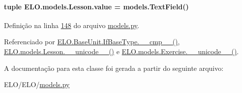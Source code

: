 \hypertarget{classELO_1_1models_1_1Lesson_a27927b9763fb13a9e41b3f826439c600}{
\paragraph[{value}]{\setlength{\rightskip}{0pt plus 5cm}tuple E\-L\-O.\-models.\-Lesson.\-value = models.\-Text\-Field()\hspace{0.3cm}{\ttfamily [static]}}}\label{classELO_1_1models_1_1Lesson_a27927b9763fb13a9e41b3f826439c600}


Definição na linha \hyperlink{ELO_2models_8py_source_l00148}{148} do arquivo \hyperlink{ELO_2models_8py_source}{models.\-py}.



Referenciado por \hyperlink{classELO_1_1BaseUnit_1_1IfBaseType_a69c338f6f1574bd3524e9d59ebc17a7c}{E\-L\-O.\-Base\-Unit.\-If\-Base\-Type.\-\_\-\-\_\-cmp\-\_\-\-\_\-()}, \hyperlink{classELO_1_1models_1_1Lesson_a3d9f0295dbe1ed5c74668d6c0876f97c}{E\-L\-O.\-models.\-Lesson.\-\_\-\-\_\-unicode\-\_\-\-\_\-()} e \hyperlink{classELO_1_1models_1_1Exercise_af3e991e5610cec815a2c3260ec6aae0b}{E\-L\-O.\-models.\-Exercise.\-\_\-\-\_\-unicode\-\_\-\-\_\-()}.



A documentação para esta classe foi gerada a partir do seguinte arquivo\-:\begin{DoxyCompactItemize}
\item 
E\-L\-O/\-E\-L\-O/\hyperlink{ELO_2models_8py}{models.\-py}\end{DoxyCompactItemize}
